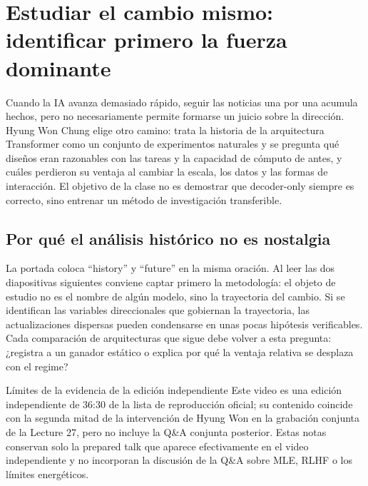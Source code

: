 \section{Estudiar el cambio mismo: identificar primero la fuerza dominante}

Cuando la IA avanza demasiado rápido, seguir las noticias una por una acumula hechos, pero no necesariamente permite formarse un juicio sobre la dirección. Hyung Won Chung elige otro camino: trata la historia de la arquitectura Transformer como un conjunto de experimentos naturales y se pregunta qué diseños eran razonables con las tareas y la capacidad de cómputo de antes, y cuáles perdieron su ventaja al cambiar la escala, los datos y las formas de interacción. El objetivo de la clase no es demostrar que decoder-only siempre es correcto, sino entrenar un método de investigación transferible.

\subsection{Por qué el análisis histórico no es nostalgia}

La portada coloca ``history'' y ``future'' en la misma oración. Al leer las dos diapositivas siguientes conviene captar primero la metodología: el objeto de estudio no es el nombre de algún modelo, sino la trayectoria del cambio. Si se identifican las variables direccionales que gobiernan la trayectoria, las actualizaciones dispersas pueden condensarse en unas pocas hipótesis verificables. Cada comparación de arquitecturas que sigue debe volver a esta pregunta: ¿registra a un ganador estático o explica por qué la ventaja relativa se desplaza con el regime?




\begin{warningbox}{Límites de la evidencia de la edición independiente}
Este video es una edición independiente de 36:30 de la lista de reproducción oficial; su contenido coincide con la segunda mitad de la intervención de Hyung Won en la grabación conjunta de la Lecture 27, pero no incluye la Q\&A conjunta posterior. Estas notas conservan solo la prepared talk que aparece efectivamente en el video independiente y no incorporan la discusión de la Q\&A sobre MLE, RLHF o los límites energéticos.
\end{warningbox}

